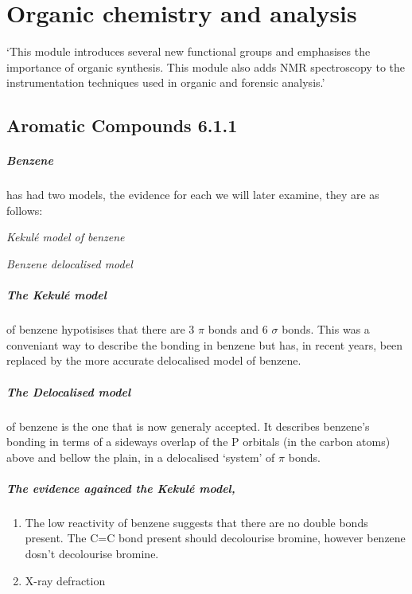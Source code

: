 \chapter{Organic chemistry and analysis}
`This module introduces several new functional groups
and emphasises the importance of organic synthesis.
This module also adds NMR spectroscopy to the instrumentation techniques used in organic and forensic analysis.'

\section{Aromatic Compounds 6.1.1}
	\paragraph{Benzene} has had two models, the evidence for each we will later examine, they are as follows:
	\begin{center}

	\textit{Kekul\'{e} model of benzene}
	
	\vspace{7mm}	
	

	\textit{Benzene delocalised model}
	\end{center}
	
	\paragraph{The Kekul\'{e} model} of benzene hypotisises that there are 3 $\pi$ bonds and 6 $\sigma$ bonds.
	This was a conveniant way to describe the bonding in benzene but has, in recent years, been replaced by the more accurate delocalised model of benzene.
	
	\paragraph{The Delocalised model} of benzene is the one that is now generaly accepted. 
	It describes benzene's bonding in terms of a sideways overlap of the P orbitals (in the carbon atoms) above and bellow the plain, in a delocalised `system' of $\pi$ bonds.
	
	\paragraph{The evidence againced the Kekul\'{e} model,}
	\begin{enumerate}
		\item The low reactivity of benzene suggests that there are no double bonds present.
		The C=C bond present should decolourise bromine, however benzene dosn't decolourise bromine.
		
		\item X-ray defraction 
	\end{enumerate}